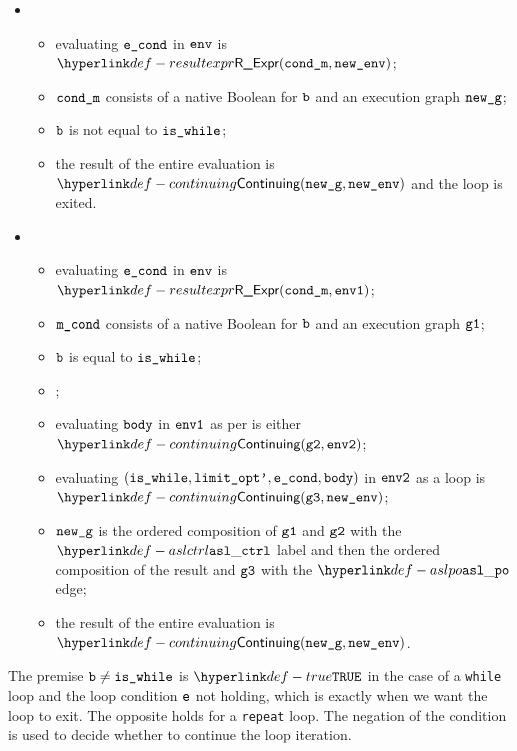 \ProseParagraph
\OneApplies
\begin{itemize}
\item {}
  \begin{itemize}
    \item evaluating $\texttt{e\_cond}$ in $\texttt{env}$ is $\ResultExpr(\condm, \newenv)$\ProseOrAbnormal;
    \item $\texttt{cond\_m}$ consists of a native Boolean for $\texttt{b}$ and an execution graph $\texttt{new\_g}$;
    \item $\texttt{b}$ is not equal to $\texttt{is\_while}$;
    \item the result of the entire evaluation is $\Continuing(\newg, \newenv)$
    and the loop is exited.
  \end{itemize}
\item {}
  \begin{itemize}
    \item evaluating $\texttt{e\_cond}$ in $\texttt{env}$ is $\ResultExpr(\condm, \envone)$\ProseOrAbnormal;
    \item $\texttt{m\_cond}$ consists of a native Boolean for $\texttt{b}$ and an execution graph $\texttt{g1}$;
    \item $\texttt{b}$ is equal to $\texttt{is\_while}$;
    \item \Proseticklooplimit{$\vlimitopt$}{$\vlimitoptp$}\ProseOrError;
    \item evaluating $\texttt{body}$ in $\texttt{env1}$ as per  is either \\
          $\Continuing(\vgtwo, \envtwo)$\ProseTerminateAs{\ReturningConfig, \ThrowingConfig, \DynErrorConfig, \TDiverging};
    \item evaluating $(\texttt{is\_while}, \texttt{limit\_opt'}, \texttt{e\_cond}, \texttt{body})$ in $\texttt{env2}$ as a loop is \\
          $\Continuing(\vgthree, \newenv)$\ProseTerminateAs{\ReturningConfig, \ThrowingConfig, \DynErrorConfig, \TDiverging};
    \item $\texttt{new\_g}$ is the ordered composition of $\texttt{g1}$ and $\texttt{g2}$ with the $\aslctrl$ label
          and then the ordered composition of the result and $\texttt{g3}$ with the $\aslpo$ edge;
    \item the result of the entire evaluation is $\Continuing(\newg, \newenv)$.
  \end{itemize}
\end{itemize}

\FormallyParagraph
The premise $\texttt{b} \neq \texttt{is\_while}$ is $\True$ in the case of a \texttt{while} loop
and the loop condition $\texttt{e}$ not holding, which is exactly when we want the
loop to exit. The opposite holds for a \texttt{repeat} loop.
The negation of the condition is used to decide whether to continue the loop iteration.

